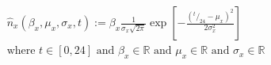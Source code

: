 \begin{equation}
\begin{split}
&\hat{n}_x(\beta_x,\mu_x,\sigma_x,t) := \beta_x\frac{1}{\sigma_x\sqrt{2\pi}} \exp\left[-\frac{\left(^t/_{24}-\mu_x\right)^2}{2\sigma_x^2}\right]\\
&\text{where } t \in [0, 24]  \text{ and } \beta_x \in \mathbb{R}  \text{ and } \mu_x \in \mathbb{R}  \text{ and } \sigma_x \in \mathbb{R}
\end{split}
\label{ch4:equ:normal-distribution}
\end{equation}
